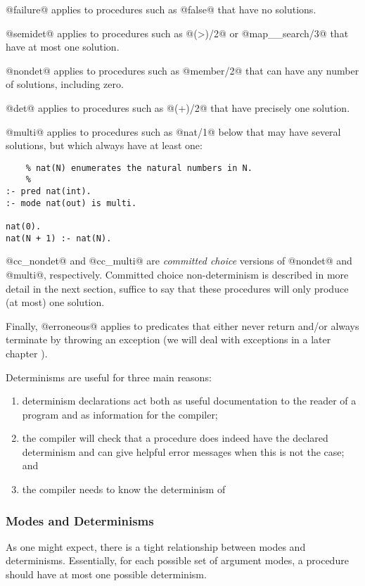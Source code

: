 @failure@ applies to procedures such as @false@ that have no
solutions.

@semidet@ applies to procedures such as @(>)/2@ or @map__search/3@
that have at most one solution.

@nondet@ applies to procedures such as @member/2@ that can have
any number of solutions, including zero.

@det@ applies to procedures such as @(+)/2@ that have precisely
one solution.

@multi@ applies to procedures such as @nat/1@ below that may have
several solutions, but which always have at least one:
\begin{verbatim}
    % nat(N) enumerates the natural numbers in N.
    %
:- pred nat(int).
:- mode nat(out) is multi.

nat(0).
nat(N + 1) :- nat(N).
\end{verbatim}
@cc_nondet@ and @cc_multi@ are \emph{committed choice} versions of
@nondet@ and @multi@, respectively.  Committed choice
non-determinism is described in more detail in the next
section, suffice to say that these procedures will only
produce (at most) one solution.

Finally, @erroneous@ applies to predicates that either never
return and/or always terminate by throwing an exception (we
will deal with exceptions in a later chapter \XXX{}).

Determinisms are useful for three main reasons:
\begin{enumerate}
\item determinism declarations act both as useful documentation
  to the reader of a program and as information for the
  compiler;
\item the compiler will check that a procedure does indeed have
  the declared determinism and can give helpful error messages
  when this is not the case; and
\item the compiler needs to know the determinism of
\end{enumerate}

\subsubsection{Modes and Determinisms}

As one might expect, there is a tight relationship between
modes and determinisms.  Essentially, for each possible
set of argument modes, a procedure should have at most one
possible determinism.


